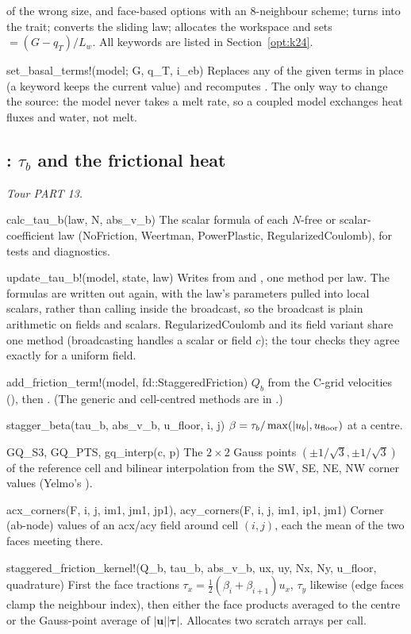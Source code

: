 \begin{fnlist}
   of the wrong size, and face-based options with an 8-neighbour scheme; turns  into the
  trait; converts the sliding law; allocates the workspace and sets  $= (G - q_T)/L_w$. All keywords are listed in
  Section~\ref{opt:k24}.
\item[set\_basal\_terms!(model; G, q\_T, i\_eb)] Replaces any of the given terms in place (a  keyword keeps the
  current value) and recomputes . The only way to change the source: the model never takes a melt rate, so a
  coupled model exchanges heat fluxes and water, not melt.
\end{fnlist}

\subsection{: $\tau_b$ and the frictional heat}\label{ref:sliding}
\emph{Tour PART 13.}
\begin{fnlist}
\item[calc\_tau\_b(law, N, abs\_v\_b)] The scalar formula of each $N$-free or scalar-coefficient law (NoFriction, Weertman,
  PowerPlastic, RegularizedCoulomb), for tests and diagnostics.
\item[update\_tau\_b!(model, state, law)] Writes  from  and , one method per law. The
  formulas are written out again, with the law's parameters pulled into local scalars, rather than calling  inside the
  broadcast, so the broadcast is plain arithmetic on fields and scalars. RegularizedCoulomb and its field variant share one method
  (broadcasting handles a scalar or field $c$); the tour checks they agree exactly for a uniform field.
\item[add\_friction\_term!(model, fd::StaggeredFriction)] $Q_b$ from the C-grid velocities (), then
  . (The generic and cell-centred methods are in .)
\item[stagger\_beta(tau\_b, abs\_v\_b, u\_floor, i, j)] $\beta = \tau_b/\max(|u_b|, u_{\rm floor})$ at a centre.
\item[GQ\_S3, GQ\_PTS, gq\_interp(c, p)] The $2\times2$ Gauss points $(\pm1/\sqrt3, \pm1/\sqrt3)$ of the reference cell and bilinear
  interpolation from the SW, SE, NE, NW corner values (Yelmo's ).
\item[acx\_corners(F, i, j, im1, jm1, jp1), acy\_corners(F, i, j, im1, ip1, jm1)] Corner (ab-node) values of an acx/acy field around cell
  $(i,j)$, each the mean of the two faces meeting there.
\item[staggered\_friction\_kernel!(Q\_b, tau\_b, abs\_v\_b, ux, uy, Nx, Ny, u\_floor, quadrature)] First the face tractions
  $\tau_x = \tfrac12(\beta_i + \beta_{i+1})u_x$, $\tau_y$ likewise (edge faces clamp the neighbour index), then either the face
  products averaged to the centre or the Gauss-point average of $|\mathbf u||\boldsymbol\tau|$. Allocates two scratch arrays per call.
\end{fnlist}
